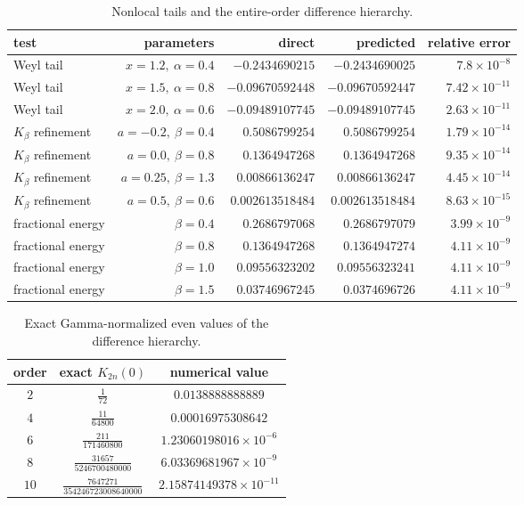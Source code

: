 \begin{table}[htbp]
\centering\small
\caption{Nonlocal tails and the entire-order difference hierarchy.}
\label{p11:tab:nonlocal-checks}
\begin{tabular}{@{}lrrrr@{}}
\toprule
test & parameters & direct & predicted & relative error\\
\midrule
Weyl tail & $x=1.2,\ \alpha=0.4$ & $-0.2434690215$ & $-0.2434690025$ & $7.8\mathbin{\times}10^{-8}$\\
Weyl tail & $x=1.5,\ \alpha=0.8$ & $-0.09670592448$ & $-0.09670592447$ & $7.42\mathbin{\times}10^{-11}$\\
Weyl tail & $x=2.0,\ \alpha=0.6$ & $-0.09489107745$ & $-0.09489107745$ & $2.63\mathbin{\times}10^{-11}$\\
$K_\beta$ refinement & $a=-0.2,\ \beta=0.4$ & $0.5086799254$ & $0.5086799254$ & $1.79\mathbin{\times}10^{-14}$\\
$K_\beta$ refinement & $a=0.0,\ \beta=0.8$ & $0.1364947268$ & $0.1364947268$ & $9.35\mathbin{\times}10^{-14}$\\
$K_\beta$ refinement & $a=0.25,\ \beta=1.3$ & $0.00866136247$ & $0.00866136247$ & $4.45\mathbin{\times}10^{-14}$\\
$K_\beta$ refinement & $a=0.5,\ \beta=0.6$ & $0.002613518484$ & $0.002613518484$ & $8.63\mathbin{\times}10^{-15}$\\
fractional energy & $\beta=0.4$ & $0.2686797068$ & $0.2686797079$ & $3.99\mathbin{\times}10^{-9}$\\
fractional energy & $\beta=0.8$ & $0.1364947268$ & $0.1364947274$ & $4.11\mathbin{\times}10^{-9}$\\
fractional energy & $\beta=1.0$ & $0.09556323202$ & $0.09556323241$ & $4.11\mathbin{\times}10^{-9}$\\
fractional energy & $\beta=1.5$ & $0.03746967245$ & $0.0374696726$ & $4.11\mathbin{\times}10^{-9}$\\
\bottomrule
\end{tabular}
\end{table}

\begin{table}[htbp]
\centering\small
\caption{Exact Gamma-normalized even values of the difference hierarchy.}
\label{p11:tab:exact-even-K}
\begingroup
\renewcommand{\arraystretch}{1.70}
\begin{tabular}{@{}ccc@{}}
\toprule
order & exact $K_{2n}(0)$ & numerical value\\
\midrule
$2$ & $\displaystyle \frac{1}{72}$ & $0.0138888888889$\\
$4$ & $\displaystyle \frac{11}{64800}$ & $0.00016975308642$\\
$6$ & $\displaystyle \frac{211}{171460800}$ & $1.23060198016\mathbin{\times}10^{-6}$\\
$8$ & $\displaystyle \frac{31657}{5246700480000}$ & $6.03369681967\mathbin{\times}10^{-9}$\\
$10$ & $\displaystyle \frac{7647271}{354246723008640000}$ & $2.15874149378\mathbin{\times}10^{-11}$\\
\bottomrule
\end{tabular}
\endgroup
\end{table}

